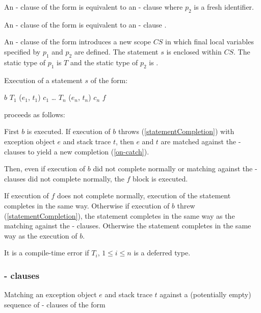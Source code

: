 \documentclass[makeidx]{article}
\begin{document}
{\LMHash{}%
An \ON{}-\CATCH{} clause of the form
is equivalent to an \ON{}-\CATCH{} clause
where $p_2$ is a fresh identifier.

An \ON{}-\CATCH{} clause of the form
is equivalent to an \ON{}-\CATCH{} clause
.

\LMHash{}%
An \ON{}-\CATCH{} clause of the form
introduces a new scope $CS$ in which final local variables
specified by $p_1$ and $p_2$ are defined.
The statement $s$ is enclosed within $CS$.
The static type of $p_1$ is $T$
and the static type of $p_2$ is .

\LMHash{}%
Execution of a \TRY{} statement $s$ of the form:

\begin{normativeDartCode}
\TRY{} $b$
\ON{} $T_1$ \CATCH{} ($e_1$, $t_1$) $c_1$
\ldots{}
\ON{} $T_n$ \CATCH{} ($e_n$, $t_n$) $c_n$
\FINALLY{} $f$
\end{normativeDartCode}
proceeds as follows:

\LMHash{}%
First $b$ is executed.
If execution of $b$ throws (\ref{statementCompletion})
with exception object $e$ and stack trace $t$,
then $e$ and $t$ are matched against the \ON{}-\CATCH{} clauses
to yield a new completion (\ref{on-catch}).

Then, even if execution of $b$ did not complete normally
or matching against the \ON{}-\CATCH{} clauses did not complete normally,
the $f$ block is executed.

If execution of $f$ does not complete normally,
execution of the \TRY{} statement completes in the same way.
Otherwise if execution of $b$ threw (\ref{statementCompletion}),
the \TRY{} statement completes in the same way as
the matching against the \ON{}-\CATCH{} clauses.
Otherwise the \TRY{} statement completes in the same way as
the execution of $b$.

\LMHash{}%
It is a compile-time error if $T_i$, $1 \le i \le n$ is a deferred type.


\subsubsection{\ON{}-\CATCH{} clauses}

\LMHash{}%
Matching an exception object $e$ and stack trace $t$ against
a (potentially empty) sequence of \ON{}-\CATCH{} clauses of the form

}
\end{document}
